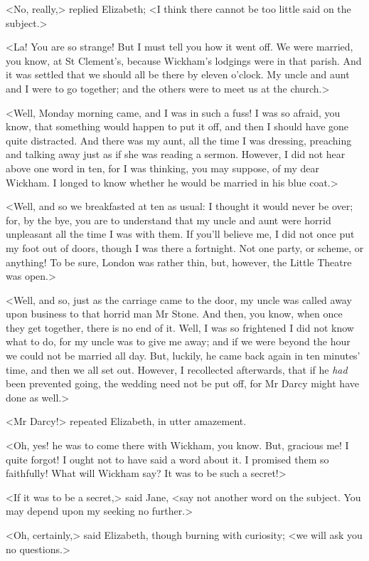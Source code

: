 <No, really,> replied Elizabeth; <I think there cannot be too little said on the subject.>

<La! You are so strange! But I must tell you how it went off. We were married, you know, at St Clement's, because Wickham's lodgings were in that parish. And it was settled that we should all be there by eleven o'clock. My uncle and aunt and I were to go together; and the others were to meet us at the church.>

<Well, Monday morning came, and I was in such a fuss! I was so afraid, you know, that something would happen to put it off, and then I should have gone quite distracted. And there was my aunt, all the time I was dressing, preaching and talking away just as if she was reading a sermon. However, I did not hear above one word in ten, for I was thinking, you may suppose, of my dear Wickham. I longed to know whether he would be married in his blue coat.>

<Well, and so we breakfasted at ten as usual: I thought it would never be over; for, by the bye, you are to understand that my uncle and aunt were horrid unpleasant all the time I was with them. If you'll believe me, I did not once put my foot out of doors, though I was there a fortnight. Not one party, or scheme, or anything! To be sure, London was rather thin, but, however, the Little Theatre was open.>

<Well, and so, just as the carriage came to the door, my uncle was called away upon business to that horrid man Mr Stone. And then, you know, when once they get together, there is no end of it. Well, I was so frightened I did not know what to do, for my uncle was to give me away; and if we were beyond the hour we could not be married all day. But, luckily, he came back again in ten minutes' time, and then we all set out. However, I recollected afterwards, that if he \textit{had} been prevented going, the wedding need not be put off, for Mr Darcy might have done as well.>

<Mr Darcy!> repeated Elizabeth, in utter amazement.

<Oh, yes! he was to come there with Wickham, you know. But, gracious me! I quite forgot! I ought not to have said a word about it. I promised them so faithfully! What will Wickham say? It was to be such a secret!>

<If it was to be a secret,> said Jane, <say not another word on the subject. You may depend upon my seeking no further.>

<Oh, certainly,> said Elizabeth, though burning with curiosity; <we will ask you no questions.>

